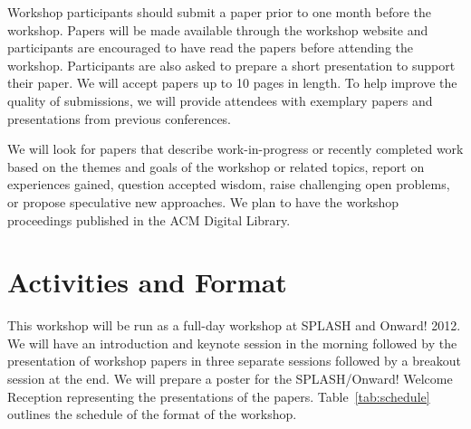 \documentclass{sigplanconf}
\begin{document}
Workshop participants should submit a paper prior to one
month before the workshop. Papers will be made available
through the workshop website and participants are encouraged to have
read the papers before attending the workshop. Participants
are also asked to prepare a short presentation to support their
paper. We will accept papers up to 10 pages in length.
To help improve the quality of submissions, 
we will provide attendees with exemplary papers and presentations
from previous conferences.

\vfill\eject

We will look for papers that describe work-in-progress or recently completed work based on the themes and goals of the workshop or related topics, report on experiences gained, question accepted wisdom, raise challenging open problems, or propose
speculative new approaches. We plan to have the workshop proceedings published in the ACM Digital Library.

\section{Activities and Format}

This workshop will be run as a full-day workshop at SPLASH and Onward! 2012.  We
will have an introduction and keynote session in the morning followed
by the presentation of workshop papers in three separate sessions followed by a breakout session at the end. We will prepare a poster for the SPLASH/Onward! Welcome Reception representing the presentations of the papers. Table~\ref{tab:schedule} outlines the schedule of the format of the workshop.
\end{document}
